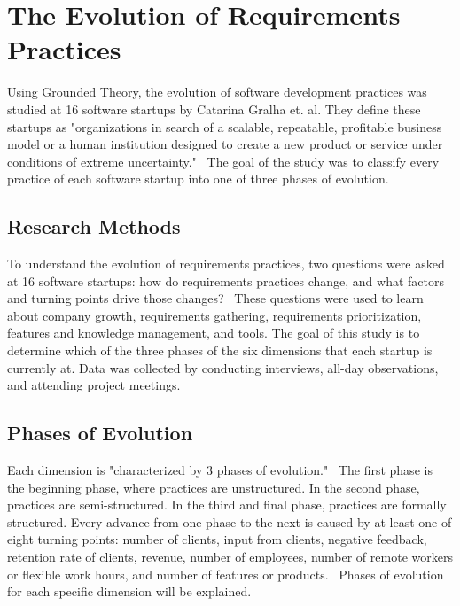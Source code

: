 \documentclass{sig-alternate}
\begin{document}
\section{The Evolution of Requirements Practices}
\label{sec:practicesEvolution}
Using Grounded Theory, the evolution of software development practices was studied at 16 software startups by Catarina Gralha et. al. They define these startups as "organizations in search of a scalable, repeatable, profitable business model or a human institution designed to create a new product or service under conditions of extreme uncertainty."~\cite{Gralha:2018} The goal of the study was to classify every practice of each software startup into one of three phases of evolution.


\subsection{Research Methods}
\label{sec:researchMethods}
To understand the evolution of requirements practices, two questions were asked at 16 software startups: how do requirements practices change, and what factors and turning points drive those changes?~\cite{Gralha:2018} These questions were used to learn about company growth, requirements gathering, requirements prioritization, features and knowledge management, and tools. The goal of this study is to determine which of the three phases of the six dimensions that each startup is currently at. Data was collected by conducting interviews, all-day observations, and attending project meetings. 

\subsection{Phases of Evolution}
\label{sec:reqPracticeEvolution}
Each dimension is "characterized by 3 phases of evolution."~\cite{Gralha:2018} The first phase is the beginning phase, where practices are unstructured. In the second phase, practices are semi-structured. In the third and final phase, practices are formally structured.  Every advance from one phase to the next is caused by at least one of eight turning points: number of clients, input from clients, negative feedback, retention rate of clients, revenue, number of employees, number of remote workers or flexible work hours, and number of features or products.~\cite{Gralha:2018} Phases of evolution for each specific dimension will be explained.
\end{document}
